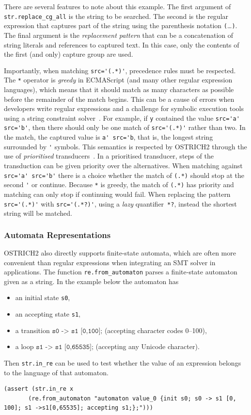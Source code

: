 There are several features to note about this example.
The first argument of \verb+str.replace_cg_all+ is the string to be searched.
The second is the regular expression that captures part of the string using the parenthesis notation \verb+(+\ldots\verb+)+.
The final argument is the \emph{replacement pattern} that can be a concatenation of string literals and references to captured text.
In this case, only the contents of the first (and only) capture group are used.

Importantly, when matching \verb+src='(.*)'+, precedence rules must be respected.
The \verb+*+ operator is \emph{greedy} in ECMAScript (and many other regular expression languages), which means that it should match as many characters as possible before the remainder of the match begins.
This can be a cause of errors when developers write regular expressions and a challenge for symbolic execution tools using a string constraint solver~\cite{LMK19}.
For example, if \verb+y+ contained the value \verb+src='a' src='b'+, then there should only be one match of \verb+src='(.*)'+ rather than two.
In the match, the captured value is \verb+a' src='b+,
that is, the longest string surrounded by \verb+'+ symbols.
This semantics is respected by OSTRICH2 through the use of \emph{prioritised} transducers~\cite{BDM14,BM17,popl22}.
In a prioritised transducer, steps of the transduction can be given priority over the alternatives.
When matching against \verb+src='a' src='b'+ there is a choice whether the match of \verb+(.*)+ should stop at the second \verb+'+ or continue.
Because \verb+*+ is greedy, the match of \verb+(.*)+ has priority and
matching can only stop if continuing would fail. When replacing the
pattern
%
\verb+src='(.*)'+ with \verb+src='(.*?)'+,
%
using a \emph{lazy} quantifier~\verb+*?+, instead the
shortest string will be matched.

\subsubsection{Automata Representations}

OSTRICH2 also directly supports finite-state automata, which are often
more convenient than regular expressions when integrating an SMT
solver in applications.
The function \verb|re.from_automaton| parses a finite‑state automaton given as a string.
In the example below the automaton has
\begin{itemize}
    \item an initial state \texttt{s0},
    \item an accepting state \texttt{s1},
    \item a transition $\texttt{s0 -> s1 [0,100];}$ (accepting character codes 0–100),
    \item a loop $\texttt{s1 -> s1 [0,65535];}$ (accepting any Unicode character).
\end{itemize}
Then \verb|str.in_re| can be used to test whether the value of an expression belongs to the language of that automaton.

\begin{lstlisting}[language=SMTLib,frame=single]
(assert (str.in_re x
       (re.from_automaton "automaton value_0 {init s0; s0 -> s1 [0, 100]; s1 ->s1[0,65535]; accepting s1;};")))
\end{lstlisting}






